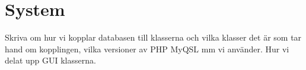 \section{System}

Skriva om hur vi kopplar databasen till klasserna och vilka klasser det är som tar hand om kopplingen, vilka versioner av PHP MyQSL mm vi använder. Hur vi delat upp GUI klasserna. 

